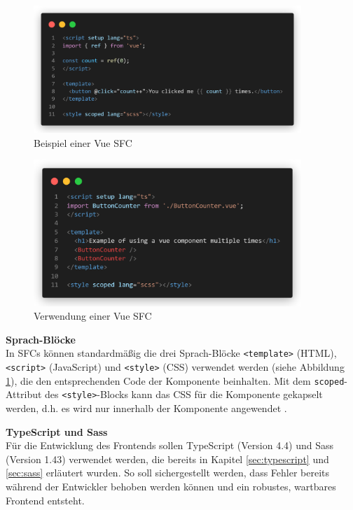 \begin{figure}[!htb]
  \includegraphics[width=0.9\textwidth]{images/vue-example.png}
  \centering
  \caption[Beispiel einer Vue-Komponente]{Beispiel einer Vue \ac{SFC} \cite{VueComponentBasics}}
  \label{fig:vue-example}
\end{figure}

\begin{figure}[!htb]
  \includegraphics[width=0.9\textwidth]{images/vue-example-usage.png}
  \centering
  \caption[Verwendung einer Vue-Komponente]{Verwendung einer Vue \ac{SFC} \cites[vgl.][]{VueComponentBasics}[vgl.][]{VueSFC}}
  \label{fig:vue-example-usage}
\end{figure}

\textbf{Sprach-Blöcke} \\
In \acp{SFC} können standardmäßig die drei Sprach-Blöcke \lstinline{<template>} (HTML), \lstinline{<script>} (JavaScript) und \lstinline{<style>} (CSS) verwendet werden (siehe Abbildung \ref{fig:vue-example}), die den entsprechenden Code der Komponente beinhalten. Mit dem \lstinline{scoped}-Attribut des \lstinline{<style>}-Blocks kann das CSS für die Komponente gekapselt werden, d.h. es wird nur innerhalb der Komponente angewendet \cite[vgl.][]{VueSFC}.

\textbf{TypeScript und Sass} \\
Für die Entwicklung des Frontends sollen TypeScript (Version 4.4) und Sass (Version 1.43) verwendet werden, die bereits in Kapitel \ref{sec:typescript} und \ref{sec:sass} erläutert wurden. So soll sichergestellt werden, dass Fehler bereits während der Entwickler behoben werden können und ein robustes, wartbares Frontend entsteht.

